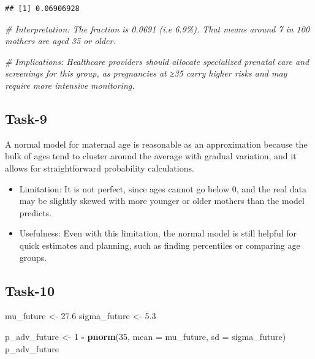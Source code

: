 \documentclass[
]{article}
\newenvironment{Shaded}{\begin{snugshade}}{\end{snugshade}}
\newcommand{\AttributeTok}[1]{\textcolor[rgb]{0.13,0.29,0.53}{#1}}
\newcommand{\CommentTok}[1]{\textcolor[rgb]{0.56,0.35,0.01}{\textit{#1}}}
\newcommand{\DecValTok}[1]{\textcolor[rgb]{0.00,0.00,0.81}{#1}}
\newcommand{\FloatTok}[1]{\textcolor[rgb]{0.00,0.00,0.81}{#1}}
\newcommand{\FunctionTok}[1]{\textcolor[rgb]{0.13,0.29,0.53}{\textbf{#1}}}
\newcommand{\NormalTok}[1]{#1}
\newcommand{\OtherTok}[1]{\textcolor[rgb]{0.56,0.35,0.01}{#1}}
\newcommand{\SpecialCharTok}[1]{\textcolor[rgb]{0.81,0.36,0.00}{\textbf{#1}}}
\begin{document}
\begin{verbatim}
## [1] 0.06906928
\end{verbatim}

\begin{Shaded}
\begin{Highlighting}[]
\CommentTok{\# Interpretation: The fraction is 0.0691 (i.e 6.9\%). That means around 7 in 100 mothers are aged 35 or older.}

\CommentTok{\# Implications: Healthcare providers should allocate specialized prenatal care and screenings for this group, as pregnancies at ≥35 carry higher risks and may require more intensive monitoring.}
\end{Highlighting}
\end{Shaded}

\subsection{Task-9}\label{task-9}

A normal model for maternal age is reasonable as an approximation
because the bulk of ages tend to cluster around the average with gradual
variation, and it allows for straightforward probability calculations.

\begin{itemize}
\item
  Limitation: It is not perfect, since ages cannot go below 0, and the
  real data may be slightly skewed with more younger or older mothers
  than the model predicts.
\item
  Usefulness: Even with this limitation, the normal model is still
  helpful for quick estimates and planning, such as finding percentiles
  or comparing age groups.
\end{itemize}

\subsection{Task-10}\label{task-10}

\begin{Shaded}
\begin{Highlighting}[]
\NormalTok{mu\_future    }\OtherTok{\textless{}{-}} \FloatTok{27.6}
\NormalTok{sigma\_future }\OtherTok{\textless{}{-}} \FloatTok{5.3}

\NormalTok{p\_adv\_future }\OtherTok{\textless{}{-}} \DecValTok{1} \SpecialCharTok{{-}} \FunctionTok{pnorm}\NormalTok{(}\DecValTok{35}\NormalTok{, }\AttributeTok{mean =}\NormalTok{ mu\_future, }\AttributeTok{sd =}\NormalTok{ sigma\_future)}
\NormalTok{p\_adv\_future}
\end{Highlighting}
\end{Shaded}
\end{document}
